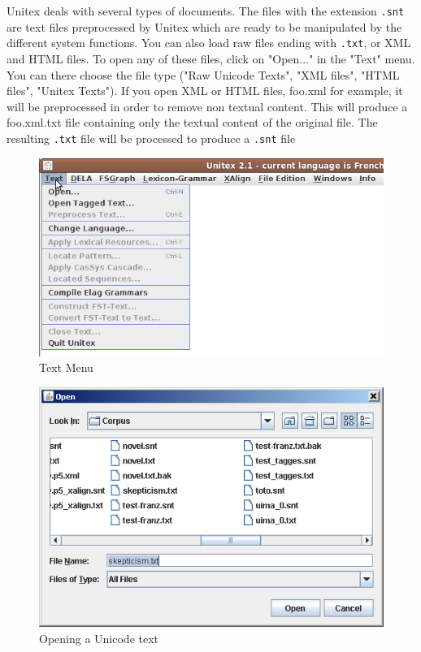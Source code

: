 Unitex deals with several types of documents. 
The files with the extension \verb+.snt+ are text files preprocessed by Unitex 
which are ready to be manipulated by the different system functions. 
You can also load raw files ending with \verb+.txt+, or XML and HTML files. 
To open any of these files, click on "Open..." in the
"Text" menu. You can there choose the file type ("Raw Unicode Texts", "XML files", "HTML files", "Unitex Texts").
If you open XML or HTML files, foo.xml for example, it will be preprocessed in order to remove non textual content. This will produce a foo.xml.txt file containing only the textual content of the original file. The resulting \verb+.txt+ file will be processed to produce a \verb+.snt+ file


\begin{figure}[!ht]
\begin{center}
\includegraphics[width=14cm]{resources/img/fig2-7.png}
\caption{Text Menu}
\end{center}
\end{figure}

\begin{figure}[!ht]
\begin{center}
\includegraphics[width=13cm]{resources/img/fig2-8.png}
\caption{Opening a Unicode text}
\end{center}
\end{figure}

